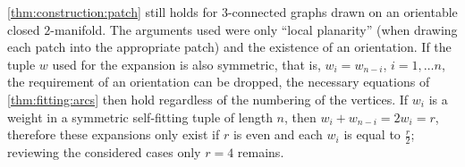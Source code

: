 \begin{remark}
  \autoref{thm:construction:patch} still holds for $3$-connected graphs drawn on an orientable closed $2$-manifold. The arguments used were only ``local planarity'' (when drawing each patch into the appropriate patch) and the existence of an orientation. If the tuple $w$ used for the expansion is also symmetric, that is, $w_i = w_{n-i}$, $i = 1, \dots n$, the requirement of an orientation can be dropped, the necessary equations of \autoref{thm:fitting:arcs} then hold regardless of the numbering of the vertices. If $w_i$ is a weight in a symmetric self-fitting tuple of length $n$, then $w_i + w_{n-i} = 2 w_i = r$, therefore these expansions only exist if $r$ is even and each $w_i$ is equal to $\frac{r}{2}$; reviewing the considered cases only $r = 4$ remains.
\end{remark}
